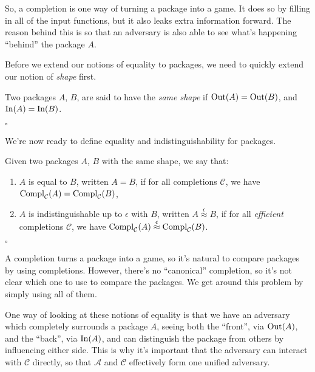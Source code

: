 So, a completion is one way of turning a package into a game.
It does so by filling in all of the input functions,
but it also leaks extra information forward.
The reason behind this is so that an adversary is also able
to see what's happening ``behind'' the package $A$.

Before we extend our notions of equality to packages, we need
to quickly extend our notion of \emph{shape} first.

\begin{definition}
    Two packages $A$, $B$, are said to have the \emph{same shape}
    if $\text{Out}(A) = \text{Out}(B)$, and $\text{In}(A) = \text{In}(B)$.

    $\square$
\end{definition}

We're now ready to define equality and indistinguishability for packages.

\begin{definition}
    Given two packages $A$, $B$ with the same shape, we say that:
    \begin{enumerate}
        \item $A$ is equal to $B$, written $A = B$, if for all completions
        $\mathcal{C}$, we have $\text{Compl}_{\mathcal{C}}(A) = \text{Compl}_{\mathcal{C}}(B)$,
        \item $A$ is indistinguishable up to $\epsilon$ with $B$, written $A \overset{\epsilon}{\approx} B$,
        if for all \emph{efficient} completions $\mathcal{C}$, we have $\text{Compl}_{\mathcal{C}}(A) \overset{\epsilon}{\approx} \text{Compl}_{\mathcal{C}}(B)$.
    \end{enumerate}

    $\square$
\end{definition}

A completion turns a package into a game, so it's natural to compare
packages by using completions.
However, there's no ``canonical'' completion, so it's not clear
which one to use to compare the packages.
We get around this problem by simply using all of them.

One way of looking at these notions of equality is that we
have an adversary which completely surrounds a package $A$,
seeing both the ``front'', via $\text{Out}(A)$, and the ``back'',
via $\text{In}(A)$, and can distinguish the package from others by influencing
either side.
This is why it's important that the adversary can interact with $\mathcal{C}$
directly, so that $\mathcal{A}$ and $\mathcal{C}$ effectively form
one unified adversary.

